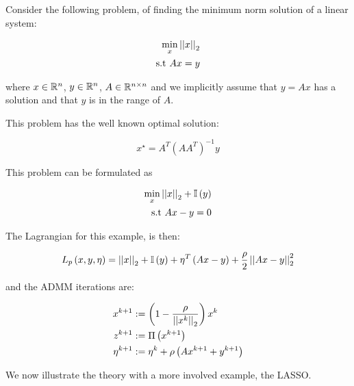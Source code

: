 \begin{example}
Consider the following problem, of finding the minimum norm solution of a linear system:

\begin{eqnarray}
\min_x \left|\left|x\right|\right|_2\\
\text{s.t } Ax = y
\end{eqnarray}

where \(x \in {\mathbb{R}}^n\), \(y \in {\mathbb{R}}^n\), \(A \in {\mathbb{R}}^{n \times n}\) and we implicitly assume that \( y = Ax\) has a solution and that \(y\) is in the range of \(A\). 

This problem has the well known optimal solution:

\begin{equation}
x^{\star} = A^T \left(AA^T\right)^{-1}y
\end{equation}

This problem can be formulated as

\begin{eqnarray}
\min_x \left|\left|x\right|\right|_2 + \mathbb{I}\left(y\right) \\
\text{s.t } Ax - y = 0
\end{eqnarray}

The Lagrangian for this example, is then:

\begin{align*}
L_p\left(x, y, \eta\right) = \left|\left|x\right|\right|_2 + \mathbb{I}\left(y\right)+\eta^T\left(Ax-y\right) + \frac{\rho}{2}\left|\left|Ax-y\right|\right|_2^2
\label{minl2_aug_lagrangian}
\end{align*}

and the ADMM iterations are:

\begin{align}
x^{k+1} &:= \left(1-\frac{\rho}{\left|\left|x^{k}\right|\right|_2}\right)x^{k}\\
z^{k+1} &:= \Pi\left(x^{k+1}\right)\\
\eta^{k+1} &:= \eta^{k} + \rho \left(Ax^{k+1} + y^{k+1}\right)
\label{minl2_algo}
\end{align}
\end{example}

We now illustrate the theory with a more involved example, the LASSO.

